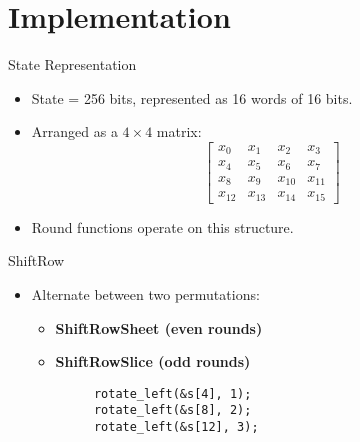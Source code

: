 
\section{Implementation}

\begin{frame}{State Representation}
    \begin{itemize}
        \item State = 256 bits, represented as 16 words of 16 bits.
        \item Arranged as a $4 \times 4$ matrix:
        \[
        \begin{bmatrix}
        x_0 & x_1 & x_2 & x_3 \\
        x_4 & x_5 & x_6 & x_7 \\
        x_8 & x_9 & x_{10} & x_{11} \\
        x_{12} & x_{13} & x_{14} & x_{15}
        \end{bmatrix}
        \]
        \item Round functions operate on this structure.
    \end{itemize}
    \end{frame}

        \begin{frame}[fragile]{ShiftRow}
            \begin{itemize}
                \item Alternate between two permutations:
                \begin{itemize}
                    \item \textbf{ShiftRowSheet (even rounds)}
                    \item \textbf{ShiftRowSlice (odd rounds)}
                \end{itemize}
            \end{itemize}
            \begin{verbatim}
            rotate_left(&s[4], 1);
            rotate_left(&s[8], 2);
            rotate_left(&s[12], 3);
            \end{verbatim}
            \end{frame}

